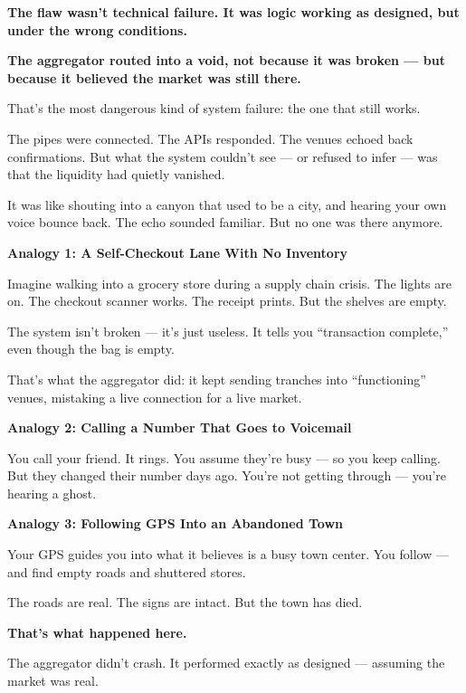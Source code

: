   


\textbf{The flaw wasn’t technical failure. It was logic working as designed, but under the wrong conditions.}

\textbf{The aggregator routed into a void, not because it was broken — but because it believed the market was still there.}

That’s the most dangerous kind of system failure: the one that still works.

The pipes were connected. The APIs responded. The venues echoed back confirmations.  
But what the system couldn't see — or refused to infer — was that the liquidity had quietly vanished.

It was like shouting into a canyon that used to be a city, and hearing your own voice bounce back.  
The echo sounded familiar. But no one was there anymore.

\medskip

\textbf{Analogy 1: A Self-Checkout Lane With No Inventory}

Imagine walking into a grocery store during a supply chain crisis.  
The lights are on. The checkout scanner works. The receipt prints.  
But the shelves are empty.

The system isn’t broken — it’s just useless.  
It tells you “transaction complete,” even though the bag is empty.

That’s what the aggregator did: it kept sending tranches into “functioning” venues, mistaking a live connection for a live market.

\medskip

\textbf{Analogy 2: Calling a Number That Goes to Voicemail}

You call your friend. It rings. You assume they’re busy — so you keep calling.  
But they changed their number days ago.  
You’re not getting through — you're hearing a ghost.

\medskip

\textbf{Analogy 3: Following GPS Into an Abandoned Town}

Your GPS guides you into what it believes is a busy town center.  
You follow — and find empty roads and shuttered stores.

The roads are real. The signs are intact. But the town has died.

\medskip

\textbf{That’s what happened here.}

The aggregator didn’t crash.  
It performed exactly as designed — assuming the market was real.

